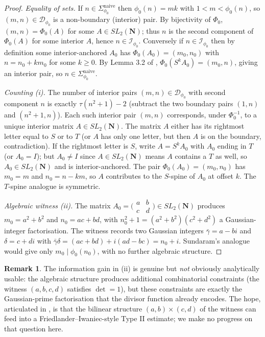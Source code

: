 \documentclass[11pt]{article}
\theoremstyle{definition}
\newtheorem{remark}[theorem]{Remark}
\newcommand{\N}{\mathbf{N}}
\newcommand{\SLN}{SL_2(\N)}
\newcommand{\Dphi}{\mathcal{D}_{\phi_0}}
\newcommand{\Phzero}{\Phi_0}
\newcommand{\Iset}{\mathcal{I}_{\phi_0}}
\begin{document}
\begin{proof}
\emph{Equality of sets.} If $n \in \Sigma_{\phi_0}^{\mathrm{naive}}$ then $\phi_0(n) = mk$ with $1 < m < \phi_0(n)$, so $(m, n) \in \Dphi$ is a non-boundary (interior) pair. By bijectivity of $\Phzero$, $(m,n) = \Phzero(A)$ for some $A \in \SLN$; thus $n$ is the second component of $\Phzero(A)$ for some interior $A$, hence $n \in \Iset$. Conversely if $n \in \Iset$ then by definition some interior-anchored $A_0$ has $\Phzero(A_0) = (m_0, n_0)$ with $n = n_0+km_0$ for some $k \ge 0$. By Lemma 3.2 of \cite{B8}, $\Phzero(S^k A_0) = (m_0, n)$, giving an interior pair, so $n \in \Sigma_{\phi_0}^{\mathrm{naive}}$.

\emph{Counting (i).} The number of interior pairs $(m,n) \in \Dphi$ with second component $n$ is exactly $\tau(n^2+1) - 2$ (subtract the two boundary pairs $(1,n)$ and $(n^2+1, n)$). Each such interior pair $(m,n)$ corresponds, under $\Phzero^{-1}$, to a unique interior matrix $A \in \SLN$. The matrix $A$ either has its rightmost letter equal to $S$ or to $T$ (or $A$ has only one letter, but then $A$ is on the boundary, contradiction). If the rightmost letter is $S$, write $A = S^k A_0$ with $A_0$ ending in $T$ (or $A_0 = I$); but $A_0 \ne I$ since $A \in \SLN$ means $A$ contains a $T$ as well, so $A_0 \in \SLN$ and is interior-anchored. The pair $\Phzero(A_0) = (m_0, n_0)$ has $m_0 = m$ and $n_0 = n - km$, so $A$ contributes to the $S$-spine of $A_0$ at offset $k$. The $T$-spine analogue is symmetric.

\emph{Algebraic witness (ii).} The matrix $A_0 = \bigl(\begin{smallmatrix}a&b\\c&d\end{smallmatrix}\bigr) \in \SLN$ produces $m_0 = a^2+b^2$ and $n_0 = ac+bd$, with $n_0^2+1 = (a^2+b^2)(c^2+d^2)$ a Gaussian-integer factorisation. The witness records two Gaussian integers $\bar\gamma = a-bi$ and $\delta = c+di$ with $\bar\gamma\delta = (ac+bd)+i(ad-bc) = n_0+i$. Sundaram's analogue would give only $m_0 \mid \phi_0(n_0)$, with no further algebraic structure.
\end{proof}

\begin{remark}\label{rem:gain}
The information gain in (ii) is genuine but \emph{not} obviously analytically usable: the algebraic structure produces additional combinatorial constraints (the witness $(a,b,c,d)$ satisfies $\det = 1$), but these constraints are exactly the Gaussian-prime factorisation that the divisor function already encodes. The hope, articulated in \cite[Sec.~3.4]{B8}, is that the bilinear structure $(a,b) \times (c,d)$ of the witness can feed into a Friedlander--Iwaniec-style Type II estimate; we make no progress on that question here.
\end{remark}
\end{document}
